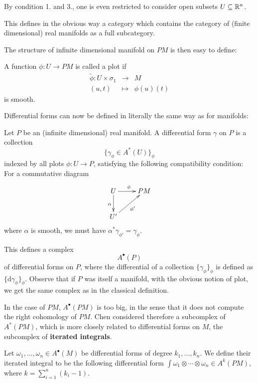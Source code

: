 \begin{rem}
By condition 1. and 3., one is even restricted to consider open subsets $U \subseteq \mathbb{R}^n$. 
\end{rem}
\begin{rem}
This defines in the obvious way
a category which contains the category of (finite dimensional) real manifolds as a full subcategory.
\end{rem}

The structure of infinite dimensional manifold on $PM$ is then easy to define:

\begin{defn}
A function $\phi: U \to PM$ is called a plot if  \[
\begin{array}{rcl}
\widetilde{\phi} : U \times \sigma_1 & \to & M \\
(u, t) & \mapsto & \phi(u)(t)
\end{array}
\]
is smooth.
\end{defn}

Differential forms can now be defined in literally the same way as for manifolds:

\begin{defn}
Let $P$ be an (infinite dimensional) real manifold. A differential form $\gamma$ on $P$ is a collection
\[ \{ \gamma_\phi \in  A^*(U) \}_\phi \]
indexed by all plots $\phi: U \to P$, satisfying the following compatibility condition: For a 
commutative diagram
\[
\xymatrix{
U \ar[r]^{\phi} \ar[d]_{\alpha} & PM \\
U' \ar[ur]_{\phi'} &
}
\]
where $\alpha$ is smooth, 
we must have $\alpha^* \gamma_{\phi'} = \gamma_{\phi}$.
\end{defn}

This defines a complex 
\[ A^\bullet(P) \]
of differential forms on $P$, where the differential of a collection $\{ \gamma_\phi \}_\phi$ is 
defined as $\{ \mathrm{d} \gamma_\phi \}_\phi$. Observe that if $P$ was itself a manifold, with the obvious notion of plot, 
we get the same complex as in the classical definition.

In the case of $PM$, $A^\bullet(PM)$ is too big, in the sense that it does not compute the right cohomology of $PM$.
Chen considered therefore a subcomplex of $A^*(PM)$, which is more closely related to differential forms on $M$, 
the subcomplex of {\bf iterated integrals}.



Let $\omega_1, \ldots, \omega_n \in A^\bullet(M)$ be differential forms of
degree $k_1, \dots, k_n$. We define their iterated integral to be the following differential form
 $\int \omega_1 \otimes \cdots \otimes \omega_n \in A^k(PM)$, where $k=\sum_{i=1}^n (k_i-1)$.

